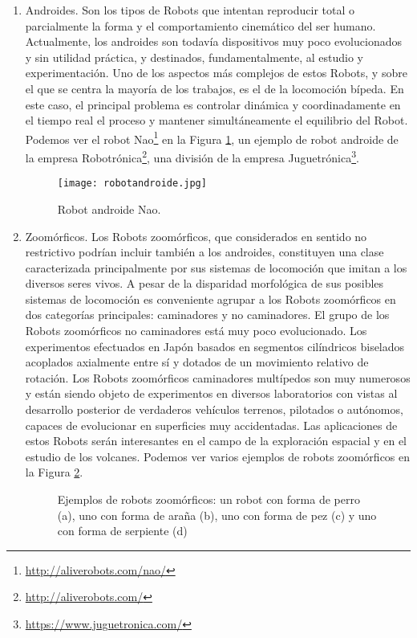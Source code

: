 \begin{enumerate}[1.]
	\item Androides. Son los tipos de Robots que intentan reproducir total o parcialmente la forma y el comportamiento cinemático del ser humano. Actualmente, los androides son todavía dispositivos muy poco evolucionados y sin utilidad práctica, y destinados, fundamentalmente, al estudio y experimentación. Uno de los aspectos más complejos de estos Robots, y sobre el que se centra la mayoría de los trabajos, es el de la locomoción bípeda. En este caso, el principal problema es controlar dinámica y coordinadamente en el tiempo real el proceso y mantener simultáneamente el equilibrio del Robot. Podemos ver el robot Nao\footnote{\url{http://aliverobots.com/nao/}} en la Figura \ref{fig:androide}, un ejemplo de robot androide de la empresa Robotrónica\footnote{\url{http://aliverobots.com/}}, una división de la empresa Juguetrónica\footnote{\url{https://www.juguetronica.com/}}. 
	\begin{figure}[h]
		\centering\texttt{[image: robotandroide.jpg]}
		\caption{Robot androide Nao.}
		\label{fig:androide}
	\end{figure}

	\item Zoomórficos. Los Robots zoomórficos, que considerados en sentido no restrictivo podrían incluir también a los androides, constituyen una clase caracterizada principalmente por sus sistemas de locomoción que imitan a los diversos seres vivos. A pesar de la disparidad morfológica de sus posibles sistemas de locomoción es conveniente agrupar a los Robots zoomórficos en dos categorías principales: caminadores y no caminadores. El grupo de los Robots zoomórficos no caminadores está muy poco evolucionado. Los experimentos efectuados en Japón basados en segmentos cilíndricos biselados acoplados axialmente entre sí y dotados de un movimiento relativo de rotación. Los Robots zoomórficos caminadores multípedos son muy numerosos y están siendo objeto de experimentos en diversos laboratorios con vistas al desarrollo posterior de verdaderos vehículos terrenos, pilotados o autónomos, capaces de evolucionar en superficies muy accidentadas. Las aplicaciones de estos Robots serán interesantes en el campo de la exploración espacial y en el estudio de los volcanes. Podemos ver varios ejemplos de robots zoomórficos en la Figura \ref{fig:zoomorficos}.
	\begin{figure}[h]
		\centering
		\hspace{0.04\textwidth}	
		\vspace{0.03\textwidth}
		\hspace{0.04\textwidth}
		\caption[Diferentes ejemplos de robots zoomórficos]{Ejemplos de robots zoomórficos: un robot con forma de perro (a), uno con forma de araña (b), uno con forma de pez (c) y uno con forma de serpiente (d)} \label{fig:zoomorficos}
	\end{figure}
	

\end{enumerate}
